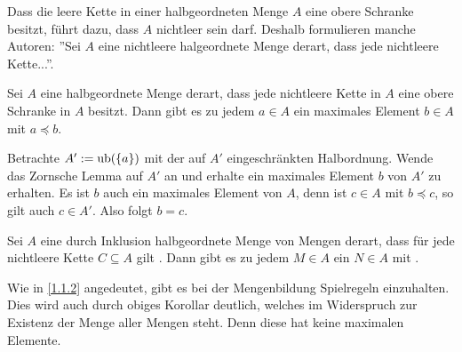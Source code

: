 \documentclass[../../main.tex]{subfiles}
\begin{document}
\begin{bem}\label{12.2.9}
Dass die leere Kette in einer halbgeordneten Menge $A$ eine obere Schranke besitzt, führt dazu, dass $A$ nichtleer sein darf. Deshalb formulieren manche Autoren: ''Sei $A$ eine nichtleere halgeordnete Menge derart, dass jede nichtleere Kette...''.
\end{bem}

\begin{kor}\label{12.2.10}
Sei $A$ eine halbgeordnete Menge derart, dass jede nichtleere Kette in $A$ eine obere Schranke in $A$ besitzt. Dann gibt es zu jedem $a\in A$ ein maximales Element $b\in A$ mit $a\preceq b$.
\end{kor}
\begin{cproof}
Betrachte $A':=\operatorname{ub}(\{a\})$ mit der auf $A'$ eingeschränkten Halbordnung. Wende das Zornsche Lemma auf $A'$ an und erhalte ein maximales Element $b$ von $A'$ zu erhalten. Es ist $b$ auch ein maximales Element von $A$, denn ist $c\in A$ mit $b\preceq c$, so gilt auch $c\in A'$. Also folgt $b=c$.
\end{cproof}

\begin{kor}\label{12.2.11}
Sei $A$ eine durch Inklusion halbgeordnete Menge von Mengen derart, dass für jede nichtleere Kette $C\subseteq A$ gilt . Dann gibt es zu jedem $M\in A$ ein  $N\in A$ mit .
\end{kor}

\begin{bem}\label{12.2.12}
Wie in \ref{1.1.2} angedeutet, gibt es bei der Mengenbildung Spielregeln einzuhalten. Dies wird auch durch obiges Korollar deutlich, welches im Widerspruch zur Existenz der Menge aller Mengen steht. Denn diese hat keine maximalen Elemente.
\end{bem}
\end{document}
